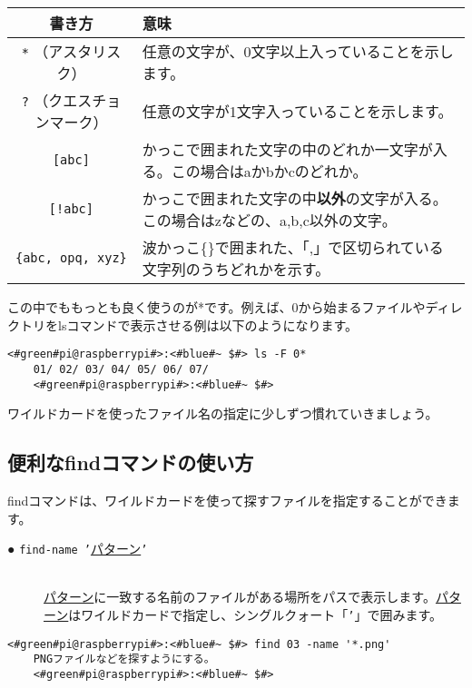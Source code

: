 \vspace{1\zh}
\begin{tabular}{cp{}} \hline
    書き方 & 意味 \\ \hline
    \texttt{*} （アスタリスク）  & 任意の文字が、0文字以上入っていることを示します。\\
    \texttt{?} （クエスチョンマーク） & 任意の文字が1文字入っていることを示します。\\
    \texttt{[abc]} & かっこで囲まれた文字の中のどれか一文字が入る。この場合はaかbかcのどれか。\\
    \texttt{[!abc]} & かっこで囲まれた文字の中{\bf 以外}の文字が入る。この場合はzなどの、a,b,c以外の文字。\\
    \texttt{\{abc, opq, xyz\}} & 波かっこ\{\}で囲まれた、「,」で区切られている文字列のうちどれかを示す。\\ \hline
\end{tabular}

この中でももっとも良く使うのが*です。例えば、0から始まるファイルやディレクトリをlsコマンドで表示させる例は以下のようになります。

\begin{lstlisting}[caption=ワイルドカードの使い方, label=wildcard]
    <#green#pi@raspberrypi#>:<#blue#~ $#> ls -F 0*
    01/ 02/ 03/ 04/ 05/ 06/ 07/ 
    <#green#pi@raspberrypi#>:<#blue#~ $#>
\end{lstlisting}

ワイルドカードを使ったファイル名の指定に少しずつ慣れていきましょう。

\subsection{便利なfindコマンドの使い方}
findコマンドは、ワイルドカードを使って探すファイルを指定することができます。

\begin{description}
    \item[● \texttt{find}\textvisiblespace \texttt{-name '}\underline{パターン}\texttt{'}]\mbox{}\\ 
    \underline{パターン}に一致する名前のファイルがある場所をパスで表示します。\underline{パターン}はワイルドカードで指定し、シングルクォート「\texttt{'}」で囲みます。
\end{description}

\begin{lstlisting}[caption=03ディレクトリからPNGファイルを探す, label=findwild]
    <#green#pi@raspberrypi#>:<#blue#~ $#> find 03 -name '*.png'
    PNGファイルなどを探すようにする。
    <#green#pi@raspberrypi#>:<#blue#~ $#>
\end{lstlisting}



    


